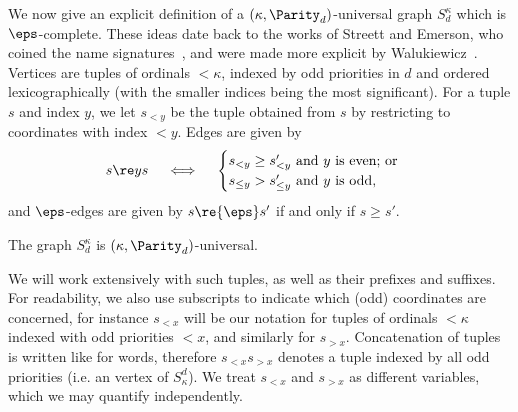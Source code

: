 We now give an explicit definition of a $(\kappa,\Parity_{d})$-universal graph $S^\kappa_{d}$ which is $\eps$-complete.
These ideas date back to the works of Streett and Emerson, who coined the name signatures~\cite{SE89}, and were made more explicit by Walukiewicz~\cite{Walukiewicz96}. 
Vertices are tuples of ordinals $<\kappa$, indexed by odd priorities in $d$ and ordered lexicographically (with the smaller indices being the most significant).
For a tuple $s$ and index $y$, we let $s_{< y}$ be the tuple obtained from $s$ by restricting to coordinates with index $< y$. %
Edges are given by
\[
    s \re y s \quad \iff \quad \begin{cases}
        s_{< y} \geq s'_{< y} \text{ and $y$ is even; or}\\
        s_{\leq y} > s'_{\leq y} \text{ and $y$ is odd,}
    \end{cases}
\]
and $\eps$-edges are given by $s \re{\eps} s'$ if and only if $s \geq s'$.

\begin{lemma}
The graph $S^\kappa_d$ is $(\kappa,\Parity_d)$-universal.
\end{lemma}

We will work extensively with such tuples, as well as their prefixes and suffixes.
For readability, we also use subscripts to indicate which (odd) coordinates are concerned, for instance $s_{<x}$ will be our notation for tuples of ordinals $< \kappa$ indexed with odd priorities $<x$, and similarly for $s_{>x}$.
Concatenation of tuples is written like for words, therefore $s_{<x} s_{>x}$ denotes a tuple indexed by all odd priorities (i.e. an vertex of $S_\kappa^d$).
We treat $s_{<x}$ and $s_{>x}$ as different variables, which we may quantify independently.
